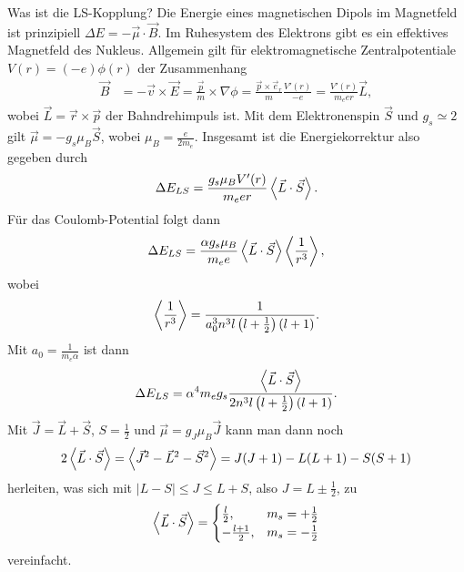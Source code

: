 
\begin{fquestion}{Was ist die LS-Kopplung?}
    Die Energie eines magnetischen Dipols im Magnetfeld ist prinzipiell $\Delta E = -\Vec{\mu}\cdot\Vec{B}$.
    Im Ruhesystem des Elektrons gibt es ein effektives Magnetfeld des Nukleus.
    Allgemein gilt für elektromagnetische Zentralpotentiale $V(r) = (-e)\phi(r)$ der Zusammenhang
    $$\begin{aligned}
        \Vec{B} &= -\Vec{v} \times \Vec{E} = \frac{\Vec{p}}{m}\times\nabla \phi = \frac{\Vec{p} \times \Vec{e}_r}{m} \frac{V'(r)}{-e} = \frac{V'(r)}{m_eer}\Vec{L},
    \end{aligned}$$
    wobei $\Vec{L} = \Vec{r} \times\Vec{p}$ der Bahndrehimpuls ist.
    Mit dem Elektronenspin $\Vec{S}$ und $g_s \simeq 2$ gilt $\Vec{\mu} = -g_s \mu_B\Vec{S}$, wobei $\mu_B = \frac{e}{2m_e}$.
    Insgesamt ist die Energiekorrektur also gegeben durch
    $$\Delta E_{LS} = \frac{g_s\mu_B V'(r)}{m_eer}  \expval{\Vec{L} \cdot \Vec{S}}.$$
    Für das Coulomb-Potential folgt dann
    $$\Delta E_{LS} = \frac{\alpha g_s\mu_B}{m_ee}  \expval{\Vec{L} \cdot \Vec{S}} \expval{\frac{1}{r^3}},$$
    wobei 
    $$\expval{\frac{1}{r^3}} = \frac{1}{a_0^3n^3 l \left( l + \frac{1}{2} \right) (l+1)}.$$
    Mit $a_0 = \frac{1}{m_e\alpha}$ ist dann 
    $$\Delta E_{LS} = \alpha^4m_e g_s \frac{\expval{\Vec{L} \cdot \Vec{S}} }{2n^3 l \left( l + \frac{1}{2} \right) (l+1)}.$$
    Mit $\Vec{J} = \Vec{L} + \Vec{S}$, $S=\frac{1}{2}$ und $\Vec{\mu} = g_J \mu_B \Vec{J}$ kann man dann noch
    $$2\expval{\Vec{L} \cdot \Vec{S}} = \expval{\Vec{J}^2 - \Vec{L}^2 - \Vec{S}^2} = J(J+1) - L(L+1) - S(S+1)$$
    herleiten, was sich mit $|L-S|\le J\le L+S$, also $J = L \pm \frac{1}{2}$, zu 
    $$\expval{\Vec{L} \cdot \Vec{S}} = \begin{cases} \frac{l}{2}, & m_s = +\frac{1}{2} \\ -\frac{l+1}{2},& m_s = -\frac{1}{2} \end{cases}$$
    vereinfacht.
\end{fquestion}

